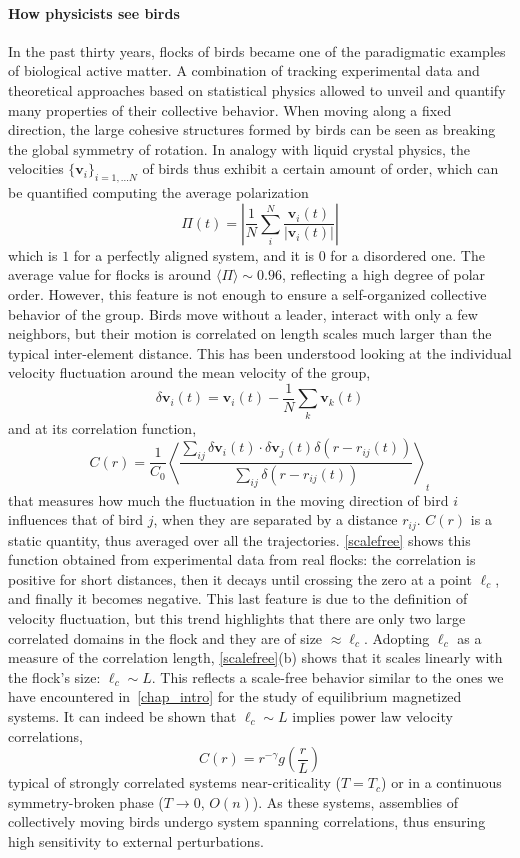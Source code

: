 \paragraph*{How physicists see birds}
In the past thirty years, flocks of birds became one of the paradigmatic examples of biological active matter. A combination of tracking experimental data and theoretical approaches based on statistical physics allowed to unveil and quantify many properties of their collective behavior. 
When moving along a fixed direction, 
the large cohesive structures formed by birds can be seen as breaking the global symmetry of rotation.
In analogy with liquid crystal physics, the velocities $\{\bm v_i\}_{i = 1,...N}$ of birds 
thus exhibit a certain amount of order,
which can be quantified computing the average polarization
\begin{equation}
\Pi(t) = \left | \frac{1}{N} \sum_{i}^N \frac{\bm v_i(t)}{|\bm v_i(t)|} \right |
\end{equation}
which is $1$ for a perfectly aligned system, and it is $0$ for a disordered one.
The average value for flocks is around $\langle \Pi \rangle \sim 0.96$, reflecting a high degree of polar order. However, this feature is not enough to ensure a self-organized collective behavior of the group. Birds move without a leader, interact with only a few neighbors, but their motion is correlated on length scales much larger than the typical inter-element distance. This has been understood looking at the individual velocity fluctuation around the mean velocity of the group,
$$
\delta \bm v_i (t) = \bm v_i(t) - \frac{1}{N} \sum_k \bm v_k(t)
$$
and at its correlation function,
\begin{equation}
 C(r) = \frac{1}{C_0} \left\langle \frac{\sum_{ij} \delta \bm v_i(t) \cdot \delta \bm v_j(t) \delta(r-r_{ij}(t))}{\sum_{ij} \delta(r-r_{ij}(t))} \right\rangle_t
\end{equation}
that measures how much the fluctuation in the moving direction of bird $i$ influences that of bird $j$, when they are separated by a distance $r_{ij}$. $C(r)$ is a static quantity, thus averaged over all the trajectories. 
\autoref{scalefree} shows this function obtained from experimental data from real flocks: the correlation is positive for short distances, then it decays until crossing the zero at a point $\ell_c$, and finally it becomes negative. This last feature is due to the definition of velocity fluctuation, but this trend highlights that there are only two large correlated domains in the flock and they are of size $\approx \ell_c$. Adopting $\ell_c$ as a measure of the correlation length, \autoref{scalefree}(b) shows that it scales linearly with the flock's size: $\ell_c \sim L$.
This reflects a scale-free behavior similar to the ones we have encountered in~\autoref{chap_intro} for the study of equilibrium magnetized systems.
It can indeed be shown that $\ell_c \sim L$ implies power law velocity correlations,
$$
C(r) = r^{-\gamma} g \left( \frac{r}{L}\right)
$$
typical of strongly correlated systems near-criticality ($T=T_c$) or in a continuous symmetry-broken phase ($T\to 0$, $O(n)$).
As these systems, assemblies of collectively moving birds undergo system spanning correlations, thus ensuring high sensitivity to external perturbations.

